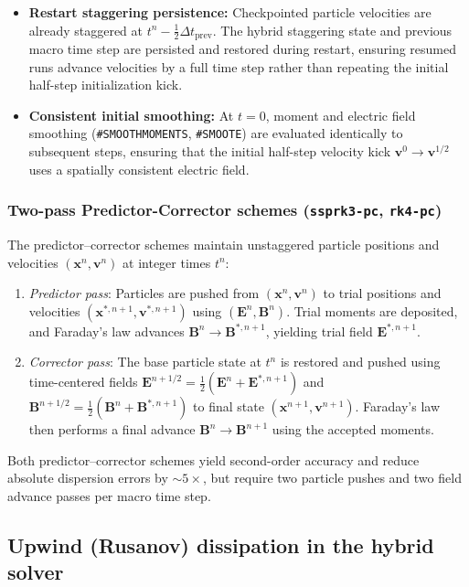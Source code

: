 \documentclass[a4paper, 11pt]{article}
\begin{document}
\begin{itemize}
\begin{itemize}
  \end{itemize}
  \item \textbf{Restart staggering persistence:} Checkpointed particle velocities are already staggered at $t^n - \tfrac{1}{2}\Delta t_{\text{prev}}$. The hybrid staggering state and previous macro time step are persisted and restored during restart, ensuring resumed runs advance velocities by a full time step rather than repeating the initial half-step initialization kick.
  \item \textbf{Consistent initial smoothing:} At $t = 0$, moment and electric field smoothing (\texttt{\#SMOOTHMOMENTS}, \texttt{\#SMOOTE}) are evaluated identically to subsequent steps, ensuring that the initial half-step velocity kick $\mathbf{v}^0 \to \mathbf{v}^{1/2}$ uses a spatially consistent electric field.
\end{itemize}

\subsubsection{Two-pass Predictor-Corrector schemes (\texttt{ssprk3-pc}, \texttt{rk4-pc})}
The predictor--corrector schemes maintain unstaggered particle positions and velocities $(\mathbf{x}^n, \mathbf{v}^n)$ at integer times $t^n$:
\begin{enumerate}
  \item \emph{Predictor pass}: Particles are pushed from $(\mathbf{x}^n, \mathbf{v}^n)$ to trial positions and velocities $(\mathbf{x}^{*,n+1}, \mathbf{v}^{*,n+1})$ using $(\mathbf{E}^n, \mathbf{B}^n)$. Trial moments are deposited, and Faraday's law advances $\mathbf{B}^n \to \mathbf{B}^{*,n+1}$, yielding trial field $\mathbf{E}^{*,n+1}$.
  \item \emph{Corrector pass}: The base particle state at $t^n$ is restored and pushed using time-centered fields $\mathbf{E}^{n+1/2} = \tfrac{1}{2}(\mathbf{E}^n + \mathbf{E}^{*,n+1})$ and $\mathbf{B}^{n+1/2} = \tfrac{1}{2}(\mathbf{B}^n + \mathbf{B}^{*,n+1})$ to final state $(\mathbf{x}^{n+1}, \mathbf{v}^{n+1})$. Faraday's law then performs a final advance $\mathbf{B}^n \to \mathbf{B}^{n+1}$ using the accepted moments.
\end{enumerate}
Both predictor--corrector schemes yield second-order accuracy and reduce absolute dispersion errors by $\sim 5\times$, but require two particle pushes and two field advance passes per macro time step.

\subsection{Upwind (Rusanov) dissipation in the hybrid solver}
\label{sec:hybrid_upwind}
\end{document}
